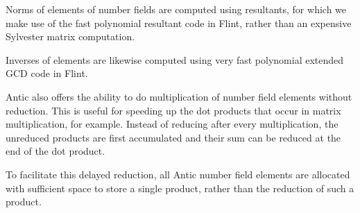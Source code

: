 \documentclass{sig-alternate-05-2015}
\begin{document}
Norms of elements of number fields are computed using resultants, for which we make use of
the fast polynomial resultant code in Flint, rather than an expensive Sylvester matrix
computation.

Inverses of elements are likewise computed using very fast polynomial extended GCD code in
Flint.

Antic also offers the ability to do multiplication of number field elements without
reduction. This is useful for speeding up the dot products that occur in matrix
multiplication, for example. Instead of reducing after every multiplication, the unreduced
products are first accumulated and their sum can be reduced at the end of the dot product.

To facilitate this delayed reduction, all Antic number field elements are allocated with
sufficient space to store a single product, rather than the reduction of such a product.
\end{document}
